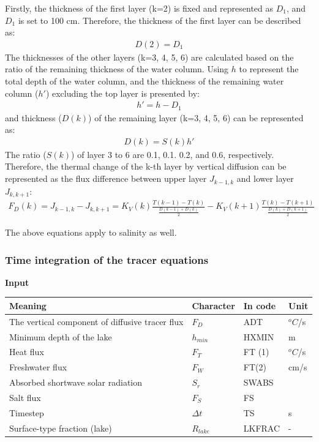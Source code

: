 Firstly, the thickness of the first layer (k=2) is fixed and represented as \(D_{1}\), and \(D_{1}\) is set to 100 cm. Therefore, the thickness of the first layer can be described as: \begin{eqnarray}
D(2)=D_{1}
\end{eqnarray} The thicknesses of the other layers (k=3, 4, 5, 6) are calculated based on the ratio of the remaining thickness of the water column. Using \(h\) to represent the total depth of the water column,
and the thickness of the remaining water column (\(h'\)) excluding the top layer is presented by: \begin{eqnarray}
h'=h-D_{1}
\end{eqnarray} and thickness (\(D(k)\)) of the remaining layer (k=3, 4, 5, 6) can be represented as: \begin{eqnarray}
D(k)=S(k)h'
\end{eqnarray} The ratio (\(S(k)\)) of layer 3 to 6 are 0.1, 0.1. 0.2, and 0.6, respectively. Therefore, the thermal change of the k-th layer by vertical diffusion can be represented as the flux difference
between upper layer \(J_{k-1, k}\) and lower layer \(J_{k, k+1}\): \begin{eqnarray}
F_{D}(k)=J_{k-1,k}-J_{k,k+1}=K_{V}(k)\frac{T(k-1)-T(k)}{\frac{D(k-1)+D(k)}{2}}-K_{V}(k+1)\frac{T(k)-T(k+1)}{\frac{D(k)+D(k+1)}{2}}
\end{eqnarray}

The above equations apply to salinity as well.

\hypertarget{time-integration-of-the-tracer-equations}{%
\subsubsection{Time integration of the tracer equations}\label{time-integration-of-the-tracer-equations}}

\textbf{Input}

\begin{longtable}[]{@{}llll@{}}
\toprule
Meaning & Character & In code & Unit \\
\midrule
\endhead
The vertical component of diffusive tracer flux & \(F_{D}\) & ADT & \(^{o}C\)/s \\
Minimum depth of the lake & \(h_{min}\) & HXMIN & m \\
Heat flux & \(F_{T}\) & FT (1) & \(^{o}C\)/s \\
Freshwater flux & \(F_{W}\) & FT(2) & cm/s \\
Absorbed shortwave solar radiation & \(S_{r}\) & SWABS & \\
Salt flux & \(F_{S}\) & FS & \\
Timestep & \(\Delta t\) & TS & s \\
Surface-type fraction (lake) & \(R_{lake}\) & LKFRAC & - \\
\bottomrule
\end{longtable}

